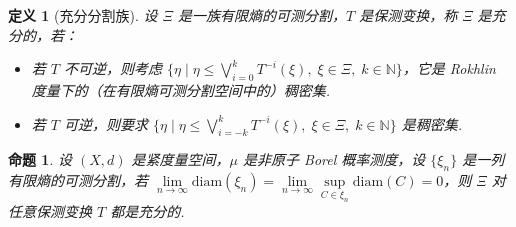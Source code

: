\documentclass[11pt, a4paper, oneside]{ctexart}
\newtheorem{definition}[theorem]{定义}
\newtheorem{proposition}[theorem]{命题}
\newcommand{\N}{\mathbb{N}}
\newcommand{\diam}{\mathrm{diam}}
\begin{document}
    \begin{definition}[充分分割族]
        设 $\Xi$ 是一族有限熵的可测分割，$T$ 是保测变换，称 $\Xi$ 是充分的，若：
        \begin{itemize}
            \item 若 $T$ 不可逆，则考虑 $\{\eta\mid \eta\leq \bigvee\limits_{i=0}^{k}T^{-i}(\xi),\; \xi\in\Xi,\; k\in\N\}$，它是 Rokhlin 度量下的（在有限熵可测分割空间中的）稠密集.
            \item 若 $T$ 可逆，则要求 $\{\eta\mid \eta\leq \bigvee\limits_{i=-k}^{k}T^{-i}(\xi),\; \xi\in\Xi,\; k\in\N\}$ 是稠密集.
        \end{itemize}
    \end{definition}
    \begin{proposition}
        设 $(X,d)$ 是紧度量空间，$\mu$ 是非原子 Borel 概率测度，设 $\{\xi_n\}$ 是一列有限熵的可测分割，若 $\lim\limits_{n\to\infty}\diam(\xi_n)=\lim\limits_{n\to\infty}\sup\limits_{C\in\xi_n}\diam(C)=0$，则 $\Xi$ 对任意保测变换 $T$ 都是充分的.
    \end{proposition}
\end{document}
